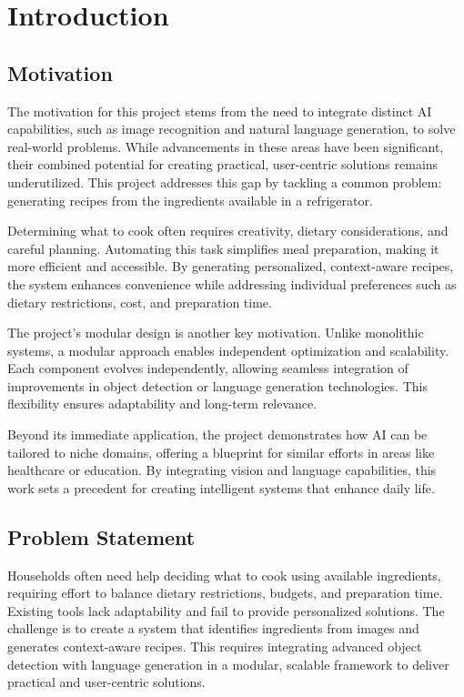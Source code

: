 \documentclass[letterpaper,11pt]{report}
\begin{document}
\mbox{}



\chapter{Introduction}\label{chapter:introduction}
\section{Motivation}

The motivation for this project stems from the need to integrate distinct AI capabilities, such as image recognition and natural language generation, to solve real-world problems. While advancements in these areas have been significant, their combined potential for creating practical, user-centric solutions remains underutilized. This project addresses this gap by tackling a common problem: generating recipes from the ingredients available in a refrigerator.

Determining what to cook often requires creativity, dietary considerations, and careful planning. Automating this task simplifies meal preparation, making it more efficient and accessible. By generating personalized, context-aware recipes, the system enhances convenience while addressing individual preferences such as dietary restrictions, cost, and preparation time. 

The project’s modular design is another key motivation. Unlike monolithic systems, a modular approach enables independent optimization and scalability. Each component evolves independently, allowing seamless integration of improvements in object detection or language generation technologies. This flexibility ensures adaptability and long-term relevance.

Beyond its immediate application, the project demonstrates how AI can be tailored to niche domains, offering a blueprint for similar efforts in areas like healthcare or education. By integrating vision and language capabilities, this work sets a precedent for creating intelligent systems that enhance daily life.
\section{Problem Statement}

Households often need help deciding what to cook using available ingredients, requiring effort to balance dietary restrictions, budgets, and preparation time. Existing tools lack adaptability and fail to provide personalized solutions. The challenge is to create a system that identifies ingredients from images and generates context-aware recipes. This requires integrating advanced object detection with language generation in a modular, scalable framework to deliver practical and user-centric solutions.
\end{document}
